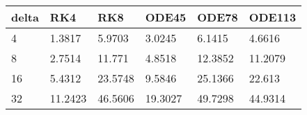 \begin{tabular}{llllll}
delta & RK4 & RK8 & ODE45 & ODE78 & ODE113 \\ 
\hline 
4 & 1.3817 & 5.9703 & 3.0245 & 6.1415 & 4.6616 \\ 
8 & 2.7514 & 11.771 & 4.8518 & 12.3852 & 11.2079 \\ 
16 & 5.4312 & 23.5748 & 9.5846 & 25.1366 & 22.613 \\ 
32 & 11.2423 & 46.5606 & 19.3027 & 49.7298 & 44.9314 \\ 
\hline 
\end{tabular}